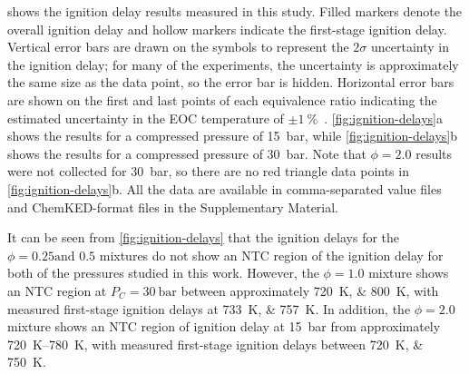 \documentclass[letterpaper, review, sort&compress]{elsarticle}
\begin{document}
 shows the ignition delay results measured in this study. Filled markers
denote the overall ignition delay and hollow markers indicate the first-stage ignition delay.
Vertical error bars are drawn on the symbols to represent the \(2\sigma\) uncertainty in the
ignition delay; for many of the experiments, the uncertainty is approximately the same size as the
data point, so the error bar is hidden. Horizontal error bars are shown on the first and last points
of each equivalence ratio indicating the estimated uncertainty in the EOC temperature of
$\pm\SI{1}{\percent}$~\cite{Weber2015}. \cref{fig:ignition-delays}a shows the results for a
compressed pressure of \SI{15}{\bar}, while \cref{fig:ignition-delays}b shows the results for a
compressed pressure of \SI{30}{\bar}. Note that $\phi=2.0$ results were not collected for
\SI{30}{\bar}, so there are no red triangle data points in \cref{fig:ignition-delays}b. All the data
are available in comma-separated value files and ChemKED-format \cite{Weber2017} files in the
Supplementary Material.

It can be seen from \cref{fig:ignition-delays} that the ignition delays for the \(\phi=0.25\text{
and } 0.5\) mixtures do not show an NTC region of the ignition delay for both of the pressures
studied in this work. However, the \(\phi=1.0\) mixture shows an NTC region at
\(P_C=\SI[number-unit-product={\ }]{30}{\bar}\) between approximately \SIlist{720;800}{\K}, with
measured first-stage ignition delays at \SIlist{733;757}{\K}. In addition, the \(\phi=2.0\) mixture
shows an NTC region of ignition delay at \SI{15}{\bar} from approximately \SIrange{720}{780}{\K},
with measured first-stage ignition delays between \SIlist{720;750}{\K}.
\end{document}
